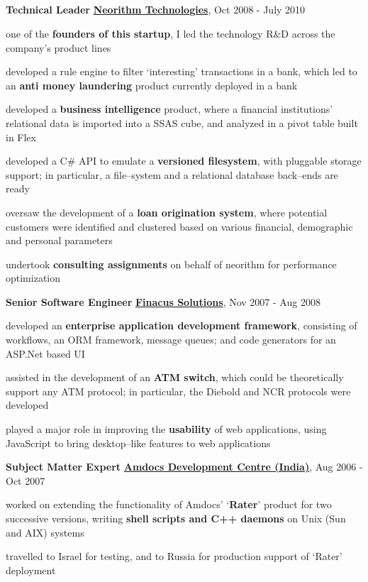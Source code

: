 \documentclass[a4paper,11pt,final]{article}
\newcommand{\resumetitle}[1]{%
  \subsection*{%
    \large\sc{#1}%
    \normalsize
  }%
  
}%
\newcommand{\jobexp}[5]{%
	\textbf{{#4}}
	\hfill
	\textbf{\href{#2}{#1}}, {#3}
	\\\vspace{-12pt}%
}
\newcommand{\resumedescheader}[1]{%
  \smallskip%
  \resumetitle{#1}
}%
\begin{document}
\vspace{-12pt}
\resumedescheader{Career}
\jobexp
	{Neorithm Technologies}
	{http://www.neorithm.com}
	{Oct 2008 - July 2010}
	{Technical Leader}
	{Core team member since inception, led the technology R\&D across the company's product lines}
\begin{itemize*}
\item one of the \textbf{founders of this startup}, I led the technology R\&D across the company's product lines
\item developed a rule engine to filter `interesting' transactions in a bank, which led to an \textbf{anti money laundering} product currently deployed in a bank
\item developed a \textbf{business intelligence} product, where a financial institutions' relational data is imported into a SSAS cube, and analyzed in a pivot table built in Flex
\item developed a C\# API to emulate a \textbf{versioned filesystem}, with pluggable storage support; in particular, a file--system and a relational database back--ends are ready
\item oversaw the development of a \textbf{loan origination system}, where potential customers were identified and clustered based on various financial, demographic and personal parameters
\item undertook \textbf{consulting assignments} on behalf of neorithm for performance optimization
\end{itemize*}
\vspace{5pt}
\jobexp
	{Finacus Solutions}
	{http://www.finacus.com}
	{Nov 2007 - Aug 2008}
	{Senior Software Engineer}
	{Core team member, enabled rapid application development with an in-house framework}
\begin{itemize*}
\item developed an \textbf{enterprise application development framework}, consisting of workflows, an ORM framework, message queues; and code generators for an ASP.Net based UI
\item assisted in the development of an \textbf{ATM switch}, which could be theoretically support any ATM protocol; in particular, the Diebold and NCR protocols were developed
\item played a major role in improving the \textbf{usability} of web applications, using JavaScript to bring desktop--like features to web applications
\end{itemize*}
\vspace{5pt}
\jobexp
	{Amdocs Development Centre (India)}
	{http://www.amdocs.com}
	{Aug 2006 - Oct 2007}
	{Subject Matter Expert}
	{Implemented Amdocs' telecom billing functionality using Unix processes}
\begin{itemize*}
\item worked on extending the functionality of Amdocs' `\textbf{Rater}' product for two successive versions, writing \textbf{shell scripts and C++ daemons} on Unix (Sun and AIX) systems
\item travelled to Israel for testing, and to Russia for production support of `Rater' deployment
\end{itemize*}
\end{document}
